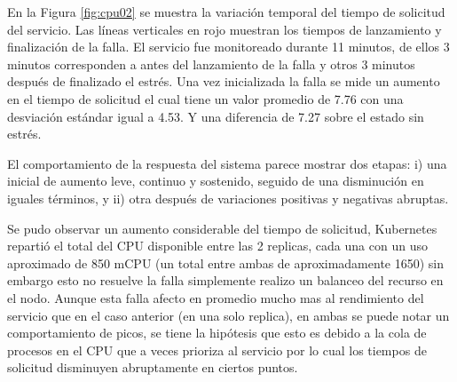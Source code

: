 
\par En la Figura \ref{fig:cpu02} se muestra la variación temporal del tiempo de solicitud del servicio. Las líneas verticales en rojo muestran los tiempos de lanzamiento y finalización de la falla. El servicio fue monitoreado durante 11 minutos, de ellos 3 minutos corresponden a antes del lanzamiento de la falla y otros 3 minutos después de finalizado el estrés. Una vez inicializada la falla se mide un aumento en el tiempo de solicitud el cual tiene un valor promedio de 7.76 con una desviación estándar igual a 4.53. Y una diferencia de 7.27 sobre el estado sin estrés.\\

\par El comportamiento de la respuesta del sistema parece mostrar dos etapas: i) una inicial de aumento leve, continuo y sostenido, seguido de una disminución en iguales términos, y ii) otra después de variaciones positivas y negativas abruptas.\\

\par Se pudo observar un aumento considerable del tiempo de solicitud, Kubernetes repartió el total del CPU disponible entre las 2 replicas, cada una con un uso aproximado de 850 mCPU (un total entre ambas de aproximadamente 1650) sin embargo esto no resuelve la falla simplemente realizo un balanceo del recurso en el nodo. Aunque esta falla afecto en promedio mucho mas al rendimiento del servicio que en el caso anterior (en una solo replica), en ambas se puede notar un comportamiento de picos, se tiene la hipótesis que esto es debido a la cola de procesos en el CPU que a veces prioriza al servicio por lo cual los tiempos de solicitud disminuyen abruptamente en ciertos puntos. \\



